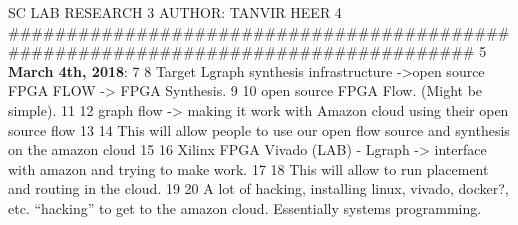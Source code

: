\documentclass{article}
\begin{document}
SC LAB RESEARCH
  3 AUTHOR: TANVIR HEER
  4 ###################################################################################
  5 
\textbf{March 4th, 2018}:
  7 
  8 Target Lgraph synthesis infrastructure ->open source FPGA FLOW -> FPGA Synthesis.
  9 
 10 open source FPGA Flow. (Might be simple).
 11 
 12 graph flow -> making it work with Amazon cloud using their open source flow
 13 
 14 This will allow people to use our open flow source and synthesis on the amazon cloud
 15 
 16 Xilinx FPGA Vivado (LAB) - Lgraph -> interface with amazon and trying to make work.
 17 
 18 This will allow to run placement and routing in the cloud.
 19 
 20 A lot of hacking, installing linux, vivado, docker?, etc. “hacking” to get to the amazon cloud. Essentially systems programming.
\end{document}
